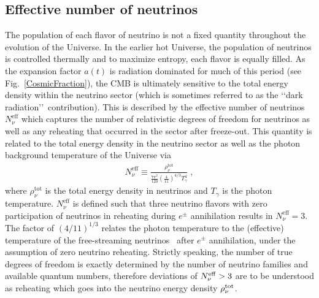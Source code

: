 \documentclass[universe,article,submit,moreauthors,pdftex,a4paper]{Definitions/mdpi}
\newcommand*{\rf}[1]{Fig.~{\ref{#1}}}
\begin{document}
\subsection{Effective number of neutrinos}\label{sec:EffectiveNeutrino}
\noindent The population of each flavor of neutrino is not a fixed quantity throughout the evolution of the Universe. In the earlier hot Universe, the population of neutrinos is controlled thermally and to maximize entropy, each flavor is equally filled. As the expansion factor $a(t)$ is radiation dominated for much of this period (see \rf{CosmicFraction}), the CMB is ultimately sensitive to the total energy density within the neutrino sector (which is sometimes referred to as the \lq\lq dark radiation\rq\rq\ contribution). 
This is described by the effective number of neutrinos $N_{\nu}^{\mathrm{eff}}$ which captures the number of relativistic degrees of freedom for neutrinos as well as any reheating that occurred in the sector after freeze-out. This quantity is related to the total energy density in the neutrino sector as well as the photon background temperature of the Universe via
\begin{align}\label{Neff}
N_\nu^{\mathrm{eff}}\equiv\frac{\rho^{\mathrm{tot}}_\nu}{\frac{7\pi^2}{120}\left(\frac{4}{11}\right)^{4/3}T_\gamma^4}\;,
\end{align}
where $\rho_\nu^{\mathrm{tot}}$ is the total energy density in neutrinos and $T_\gamma$ is the photon temperature. $N_\nu^{\mathrm{eff}}$ is defined such that three neutrino flavors with zero participation of neutrinos in reheating during $e^\pm$ annihilation results in $N_\nu^{\mathrm{eff}}=3$. The factor of $\left(4/11\right)^{1/3}$ relates the photon temperature to the (effective) temperature of the free-streaming neutrinos~\cite{Coleman:2003hs} after $e^\pm$ annihilation, under the assumption of zero neutrino reheating. Strictly speaking, the number of true degrees of freedom is exactly determined by the number of neutrino families and available quantum numbers, therefore deviations of $N_{\nu}^{{\rm eff}}>3$ are to be understood as reheating which goes into the neutrino energy density $\rho_{\nu}^{{\rm tot}}$.
\end{document}
